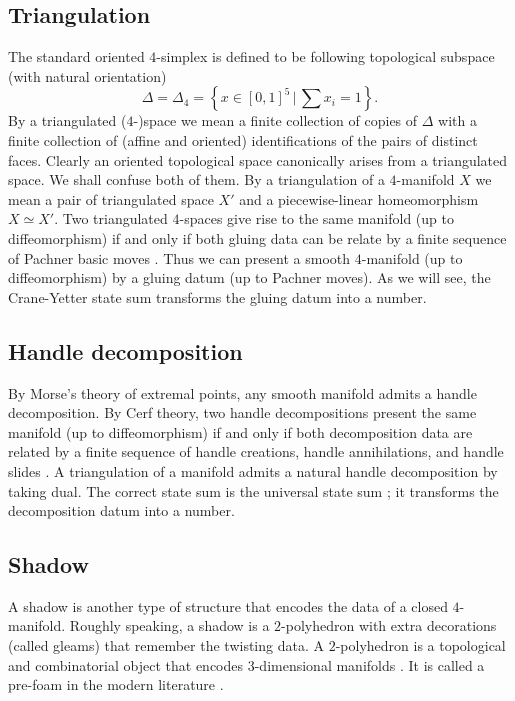 \subsection{Triangulation}

\noindent The standard oriented $4$-simplex is defined to be
following topological subspace (with natural orientation)
$$\Delta = \Delta_{4} = \left\{x \in [0,1]^{5} \,|\, \sum x_{i} = 1 \right\}.$$
By a triangulated ($4$-)space we mean a finite collection of
copies of $\Delta$ with a finite collection of (affine and
oriented) identifications of the pairs of distinct faces. Clearly
an oriented topological space canonically arises from a
triangulated space. We shall confuse both of them. By a
triangulation of a $4$-manifold $X$ we mean a pair of
triangulated space $X'$ and a piecewise-linear homeomorphism
$X \simeq X'$. Two triangulated $4$-spaces give rise to the same
manifold (up to diffeomorphism) if and only if both gluing data
can be relate by a finite sequence of Pachner basic moves
\cite{?}. Thus we can present a smooth $4$-manifold (up to
diffeomorphism) by a gluing datum (up to Pachner moves). As we
will see, the Crane-Yetter state sum transforms the gluing datum
into a number.

\subsection{Handle decomposition}

\noindent By Morse's theory of extremal points, any smooth
manifold admits a handle decomposition. By Cerf theory, two
handle decompositions present the same manifold (up to
diffeomorphism) if and only if both decomposition data are
related by a finite sequence of handle creations, handle
annihilations, and handle slides \cite{?}. A triangulation of a
manifold admits a natural handle decomposition by taking dual.
The correct state sum is the universal state sum \cite{?}; it
transforms the decomposition datum into a number.

\subsection{Shadow}

\noindent A shadow is another type of structure that encodes the
data of a closed $4$-manifold. Roughly speaking, a shadow is a
$2$-polyhedron with extra decorations (called gleams) that
remember the twisting data. A $2$-polyhedron is a topological and
combinatorial object that encodes $3$-dimensional manifolds
\cite{?Matveev}. It is called a pre-foam in the modern literature
\cite{khovanov-robert/foam}.

